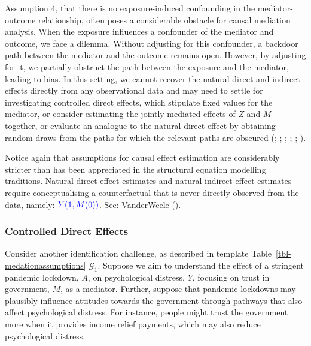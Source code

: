 \documentclass[
  single column]{article}
\begin{document}
Assumption 4, that there is no exposure-induced confounding in the
mediator-outcome relationship, often poses a considerable obstacle for
causal mediation analysis. When the exposure influences a confounder of
the mediator and outcome, we face a dilemma. Without adjusting for this
confounder, a backdoor path between the mediator and the outcome remains
open. However, by adjusting for it, we partially obstruct the path
between the exposure and the mediator, leading to bias. In this setting,
we cannot recover the natural direct and indirect effects directly from
any observational data and may need to settle for investigating
controlled direct effects, which stipulate fixed values for the
mediator, or consider estimating the jointly mediated effects of \(Z\)
and \(M\) together, or evaluate an analogue to the natural direct effect
by obtaining random draws from the paths for which the relevant paths
are obscured (;
;
;
;
; ).

Notice again that assumptions for causal effect estimation are
considerably stricter than has been appreciated in the structural
equation modelling traditions. Natural direct effect estimates and
natural indirect effect estimates require conceptualising a
counterfactual that is never directly observed from the data, namely:
\(\textcolor{blue}{Y(1, M(0))}\). See: VanderWeele
().

\subsubsection{Controlled Direct
Effects}\label{controlled-direct-effects}

Consider another identification challenge, as described in template
Table~\ref{tbl-medationassumptions} \(\mathcal{G}_1\). Suppose we aim to
understand the effect of a stringent pandemic lockdown, \(A\), on
psychological distress, \(Y\), focusing on trust in government, \(M\),
as a mediator. Further, suppose that pandemic lockdowns may plausibly
influence attitudes towards the government through pathways that also
affect psychological distress. For instance, people might trust the
government more when it provides income relief payments, which may also
reduce psychological distress.
\end{document}
